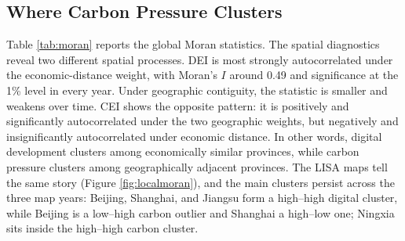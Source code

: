 \documentclass[economies,article,submit,moreauthors]{Definitions/mdpi}
\begin{document}
\subsection{Where Carbon Pressure Clusters}

Table \ref{tab:moran} reports the global Moran statistics. The spatial diagnostics reveal two different spatial processes. DEI is most strongly autocorrelated under the economic-distance weight, with Moran's $I$ around 0.49 and significance at the 1\% level in every year. Under geographic contiguity, the statistic is smaller and weakens over time. CEI shows the opposite pattern: it is positively and significantly autocorrelated under the two geographic weights, but negatively and insignificantly autocorrelated under economic distance. In other words, digital development clusters among economically similar provinces, while carbon pressure clusters among geographically adjacent provinces. The LISA maps tell the same story (Figure \ref{fig:localmoran}), and the main clusters persist across the three map years: Beijing, Shanghai, and Jiangsu form a high--high digital cluster, while Beijing is a low--high carbon outlier and Shanghai a high--low one; Ningxia sits inside the high--high carbon cluster.
\end{document}
